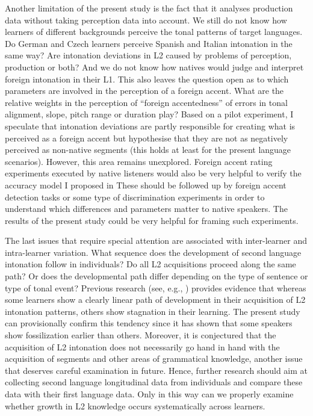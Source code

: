 Another limitation of the present study is the fact that it analyses production data without taking perception data into account. We still do not know how learners of different backgrounds perceive the tonal patterns of target languages. Do German and Czech learners perceive Spanish and Italian intonation in the same way? Are intonation deviations in L2 caused by problems of perception, production or both? And we do not know how natives would judge and interpret foreign intonation in their L1. This also leaves the question open as to which parameters are involved in the perception of a foreign accent. What are the relative weights in the perception of “foreign accentedness” of errors in tonal alignment, slope, pitch range or duration play? Based on a pilot experiment, I speculate that intonation deviations are partly responsible for creating what is perceived as a foreign accent but hypothesise that they are not as negatively perceived as non-native segments (this holds at least for the present language scenarios). However, this area remains unexplored. Foreign accent rating experiments executed by native listeners would also be very helpful to verify the accuracy model I proposed in  These should be followed up by foreign accent detection tasks or some type of discrimination experiments in order to understand which differences and parameters matter to native speakers. The results of the present study could be very helpful for framing such experiments.



The last issues that require special attention are associated with inter-learner and intra-learner variation. What sequence does the development of second language intonation follow in individuals? Do all L2 acquisitions proceed along the same path? Or does the developmental path differ depending on the type of sentence or type of tonal event? Previous research (see, e.g.,  \citealt{MéndezSeijas2018}) provides evidence that whereas some learners show a clearly linear path of development in their acquisition of L2 intonation patterns, others show stagnation in their learning. The present study can provisionally confirm this tendency since it has shown that some speakers show fossilization earlier than others. Moreover, it is conjectured that the acquisition of L2 intonation does not necessarily go hand in hand with the acquisition of segments and other areas of grammatical knowledge, another issue that deserves careful examination in future. Hence, further research should aim at collecting second language longitudinal data from individuals and compare these data with their first language data. Only in this way can we properly examine whether growth in L2 knowledge occurs systematically across learners.




